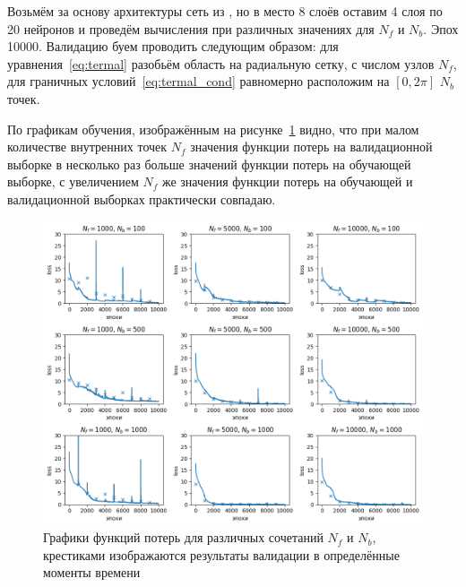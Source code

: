 \documentclass[a4paper,14pt]{extarticle} %
\def\oldcite{} \let\oldcite=\cite
\def\cite{\stepcounter{citesnum}\oldcite}
\begin{document}
Возьмём за основу архитектуры сеть из \cite{bib:pinn:first}, но в место 8 слоёв оставим 4 слоя по 20 нейронов и проведём вычисления при различных значениях для $N_f$ и $N_b$. Эпох 10000. Валидацию буем проводить следующим образом: для уравнения~\eqref{eq:termal} разобьём область на радиальную сетку, с числом узлов $N_f$, для граничных условий~\eqref{eq:termal_cond} равномерно расположим на $[0, 2\pi]$ $N_b$ точек.

По графикам обучения, изображённым на рисунке~\ref{fig:termal_loss} видно, что при малом количестве внутренних точек $N_f$ значения функции потерь на валидационной выборке в несколько раз больше значений функции потерь на обучающей выборке, с увеличением $N_f$ же значения функции потерь на обучающей и валидационной выборках практически совпадаю.

\begin{figure}[htb!]
    \includegraphics[width=\textwidth]{../plots/termal/loss l = (20x4) Nf=[1000, 5000, 10000] Nu=[100, 500, 1000].png}
    \caption{Графики функций потерь для различных сочетаний $N_f$ и $N_b$, крестиками изображаются результаты валидации в определённые моменты времени}
    \label{fig:termal_loss}
\end{figure}

\end{document}
